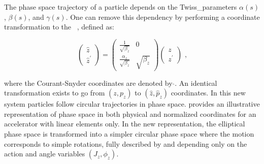 The phase space trajectory of a particle depends on the \gls{Twiss_parameters} \(\alpha(s)\), \(\beta(s)\), and \(\gamma(s)\).
One can remove this dependency by performing a coordinate transformation to the ~\cite{BOOK:Bazzani:Normal_Form_Approach_Betatron_Motion}, defined as:

\begin{equation}
    \begin{pmatrix}
        \hat{z} \\
        \hat{z}^{\prime}
    \end{pmatrix}
    =
    \begin{pmatrix}
        \frac{1}{\sqrt{\beta_z}}         &  0 \\
        \frac{\alpha_z}{\sqrt{\beta_z}}  &  \sqrt{\beta_z}
    \end{pmatrix}
    \begin{pmatrix}
        z \\
        z^{\prime}
    \end{pmatrix} \text{ ,}
    \label{equation:physical_to_courant_snyder_coordinates}
\end{equation}
\vspace{1mm}

\noindent
where the Courant-Snyder coordinates are denoted by \(\hat{ }\).
An identical transformation exists to go from \((z, p_z)\) to \((\hat{z}, \hat{p}_z)\) coordinates.
In this new system particles follow circular trajectories in phase space.
 provides an illustrative representation of phase space in both physical and normalized coordinates for an accelerator with linear elements only.
In the new representation, the elliptical phase space is transformed into a simpler circular phase space where the motion corresponds to simple rotations, fully described by and depending only on the \gls{action} and angle variables \((J_z, \phi_z)\).
\vspace{3mm}

